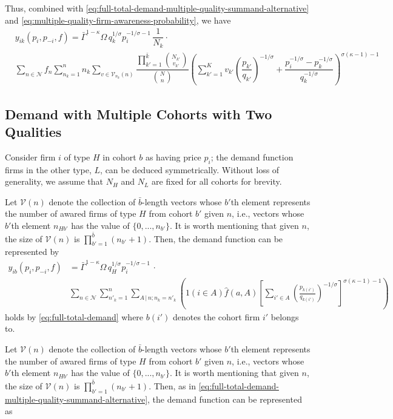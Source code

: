 \documentclass[12pt]{article}
\begin{document}
Thus, combined with \eqref{eq:full-total-demand-multiple-quality-summand-alternative} and \eqref{eq:multiple-quality-firm-awareness-probability}, we have
\begin{align}
& y_{ik}(p_i, p_{-i}, f) 
=  \bar{\Gamma}^{1-\kappa}\Omega \, q_k^{1/\sigma}p_i^{-1/\sigma - 1}\, \dfrac{1}{N_k} \cdot \\ 
&\sum_{n \in \mathcal{N} } f_n   \sum_{n_k =1}^n  
n_k \sum_{v \in \mathcal{V}_{n_k} (n)} 
\dfrac{\prod_{k'=1}^{\bar k} \binom{ N_{k'} }{ v_{k'} } }{\binom{N}{n}}
\left( 
\sum_{k' =1 }^{K} v_{k'} \left( \dfrac{p_{k'}}{q_{k'}}  \right)^{-1/\sigma} +   
\dfrac{p_i^{-1/\sigma}   - p^{-1/\sigma}_{k} }{{ q_k^{-1/\sigma }}}
\right)^{\sigma (\kappa - 1)-1}
\end{align}

\subsection{Demand with Multiple Cohorts with Two Qualities}
Consider firm $i$ of type $H$ in cohort $b$ as having price $p_i$; the demand function firms in the other type, $L$, can be deduced symmetrically. Without loss of generality, we assume that $N_H$ and $N_L$ are fixed for all cohorts for brevity.  

Let $\mathcal{V} (n)$ denote the collection of $\bar b$-length vectors whose $b'$th element represents the number of awared firms of type $H$ from cohort $b'$ given $n$, i.e., vectors whose $b'$th element $n_{Hb'}$ has the value of $\{0,..., n_{b'} \}$. It is worth mentioning that given $n$, the size of $\mathcal{V} (n)$ is $\prod_{b'=1}^{\bar b} (n_{b'} + 1)$. Then, the demand function can be represented by
\begin{align}
y_{ib}(p_i, p_{-i}, f) &= \bar{\Gamma}^{1-\kappa}\Omega \, q_H^{1/\sigma}p_i^{-1/\sigma - 1}\, \cdot \\
& \sum_{n \in \mathcal{N} } \sum_{n'_k =1}^n \sum_{{A}\,|\,n; n_k = n'_k}\left( 1( i \in A ) \hat{f}(a,A)\left[\sum_{i'\in A}\left( \frac{p_{k(i')}}{q_{k(i')}}\right)^{-1/\sigma}\right]^{\sigma (\kappa - 1)-1}\right)  
\label{eq:full-total-demand-multiple-cohorts-two-quality}
\end{align}
holds by \cref{eq:full-total-demand} where $b(i')$ denotes the cohort firm $i'$ belongs to. 


Let $\mathcal{V} (n)$ denote the collection of $\bar b$-length vectors whose $b'$th element represents the number of awared firms of type $H$ from cohort $b'$ given $n$, i.e., vectors whose $b'$th element $n_{Hb'}$ has the value of $\{0,..., n_{b'} \}$. It is worth mentioning that given $n$, the size of $\mathcal{V} (n)$ is $\prod_{b'=1}^{\bar b} (n_{b'} + 1)$. Then, as in \eqref{eq:full-total-demand-multiple-quality-summand-alternative}, the demand function can be represented as
\end{document}
